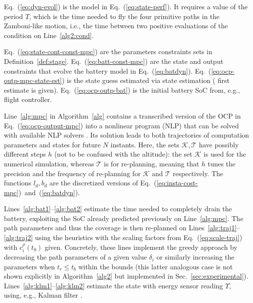 \documentclass[letterpaper,10pt,conference,twoside]{IEEEtran}
\theoremstyle{definition}
\begin{document}
Eq.~(\ref{eq:dyn-evol}) is the model in Eq.~(\ref{eq:state-perf}). {\color{black}It} requires a value of the period $T$, which is %
the time needed to fly the four primitive paths in the Zamboni-like motion, i.e., the time %
between two positive evaluations of the condition on Line~\ref{alg2:cond}.

Eq.~(\ref{eq:state-cont-const-mpc}) are the parameters constraints sets in Definition~\ref{def:stage}. Eq.~(\ref{eq:batt-const-mpc}) are the state and output constraints %
that evolve the battery model in Eq.~(\ref{eq:batdyn}). Eq.~(\ref{eq:ocp-outp-mpc-state-est}) is the state guess estimated via state estimation %
(%
first estimate is given). Eq.~(\ref{eq:ocp-outp-bat}) is the initial battery SoC from, e.g., flight controller.

Line~\ref{alg:mpc} in Algorithm~\ref{alg} contains a transcribed version of the OCP in Eq.~(\ref{eq:ocp-output-mpc}) into a nonlinear program (NLP) that can be %
solved with available NLP solvers%
. Its solution leads to both trajectories of {\color{black} computation} parameters and states for future $N$ instants. Here, the sets $\mathcal{K},\mathcal{T}$ have possibly different steps $h$ (not to be confused with the altitude){\color{black}: 
the set $\mathcal{K}$ is used for the numerical simulation, whereas $\mathcal{T}$ is for re-planning, meaning that $h$ tunes the precision and the frequency of re-planning for $\mathcal{K}$ and $\mathcal{T}$ respectively.}
The functions $l_d,b_d$ are the discretized versions of Eq.~(\ref{eq:insta-cost-mpc})~and~(\ref{eq:batdyn}).%

Lines~\ref{alg:bat1}--\ref{alg:bat2} estimate the time needed to completely drain the battery, exploiting the SoC already predicted previously on Line~\ref{alg:mpc}. The {\color{black}path parameters and thus the} coverage is then re{\color{black}-}planned %
on Lines~\ref{alg:traj1}--\ref{alg:traj2} using {\color{black} the heuristics with the} %
scaling factors from Eq.~(\ref{eq:scale-traj}) with $c_{i}^{\rho}(t_0)$ given. 
{\color{black} Concretely, these lines implement the greedy approach by decreasing the path parameters of a given value $\delta_i$ or similarly increasing the parameters when $t_r\leq t_b$ within the bounds (this latter analogous case is not shown explicitly in Algorithm~\ref{alg2} but implemented in Sec.~\ref{sec:experimental})}.
Lines~\ref{alg:klm1}--\ref{alg:klm2} estimate the %
state with %
energy sensor reading $\Upsilon$, {\color{black}using}, e.g., %
Kalman filter%
.
\end{document}
